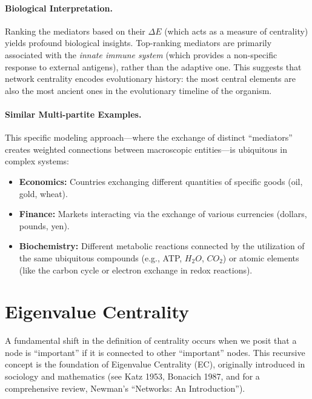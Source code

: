 \begin{example}
    \paragraph{Biological Interpretation.} Ranking the mediators based on their $\Delta E$ (which acts as a measure of centrality) yields profound biological insights. Top-ranking mediators are primarily associated with the \textit{innate immune system} (which provides a non-specific response to external antigens), rather than the adaptive one. This suggests that network centrality encodes evolutionary history: the most central elements are also the most ancient ones in the evolutionary timeline of the organism.
\end{example}

\paragraph{Similar Multi-partite Examples.} This specific modeling approach—where the exchange of distinct ``mediators'' creates weighted connections between macroscopic entities—is ubiquitous in complex systems:
\begin{itemize}
    \item \textbf{Economics:} Countries exchanging different quantities of specific goods (oil, gold, wheat).
    \item \textbf{Finance:} Markets interacting via the exchange of various currencies (dollars, pounds, yen).
    \item \textbf{Biochemistry:} Different metabolic reactions connected by the utilization of the same ubiquitous compounds (e.g., ATP, $H_2O$, $CO_2$) or atomic elements (like the carbon cycle or electron exchange in redox reactions).
\end{itemize}


\section{Eigenvalue Centrality}

A fundamental shift in the definition of centrality occurs when we posit that a node is ``important'' if it is connected to other ``important'' nodes. This recursive concept is the foundation of Eigenvalue Centrality (EC), originally introduced in sociology and mathematics (see Katz 1953, Bonacich 1987, and for a comprehensive review, Newman's ``Networks: An Introduction'').

